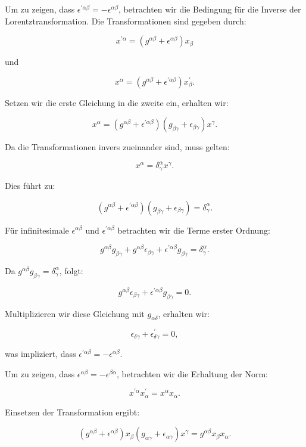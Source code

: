 Um zu zeigen, dass $\epsilon^{\prime \alpha \beta} = - \epsilon^{\alpha \beta}$, betrachten wir die Bedingung für die Inverse der Lorentztransformation. Die Transformationen sind gegeben durch:

\[
x^{\prime \alpha} = \left(g^{\alpha \beta} + \epsilon^{\alpha \beta}\right) x_\beta
\]

und

\[
x^\alpha = \left(g^{\alpha \beta} + \epsilon^{\prime \alpha \beta}\right) x_\beta^{\prime}.
\]

Setzen wir die erste Gleichung in die zweite ein, erhalten wir:

\[
x^\alpha = \left(g^{\alpha \beta} + \epsilon^{\prime \alpha \beta}\right) \left(g_{\beta \gamma} + \epsilon_{\beta \gamma}\right) x^\gamma.
\]

Da die Transformationen invers zueinander sind, muss gelten:

\[
x^\alpha = \delta^\alpha_\gamma x^\gamma.
\]

Dies führt zu:

\[
\left(g^{\alpha \beta} + \epsilon^{\prime \alpha \beta}\right) \left(g_{\beta \gamma} + \epsilon_{\beta \gamma}\right) = \delta^\alpha_\gamma.
\]

Für infinitesimale $\epsilon^{\alpha \beta}$ und $\epsilon^{\prime \alpha \beta}$ betrachten wir die Terme erster Ordnung:

\[
g^{\alpha \beta} g_{\beta \gamma} + g^{\alpha \beta} \epsilon_{\beta \gamma} + \epsilon^{\prime \alpha \beta} g_{\beta \gamma} = \delta^\alpha_\gamma.
\]

Da $g^{\alpha \beta} g_{\beta \gamma} = \delta^\alpha_\gamma$, folgt:

\[
g^{\alpha \beta} \epsilon_{\beta \gamma} + \epsilon^{\prime \alpha \beta} g_{\beta \gamma} = 0.
\]

Multiplizieren wir diese Gleichung mit $g_{\alpha \delta}$, erhalten wir:

\[
\epsilon_{\delta \gamma} + \epsilon^{\prime}_{\delta \gamma} = 0,
\]

was impliziert, dass $\epsilon^{\prime \alpha \beta} = - \epsilon^{\alpha \beta}$.

Um zu zeigen, dass $\epsilon^{\alpha \beta} = -\epsilon^{\beta \alpha}$, betrachten wir die Erhaltung der Norm:

\[
x^{\prime \alpha} x^{\prime}_\alpha = x^\alpha x_\alpha.
\]

Einsetzen der Transformation ergibt:

\[
\left(g^{\alpha \beta} + \epsilon^{\alpha \beta}\right) x_\beta \left(g_{\alpha \gamma} + \epsilon_{\alpha \gamma}\right) x^\gamma = g^{\alpha \beta} x_\beta x_\alpha.
\]

